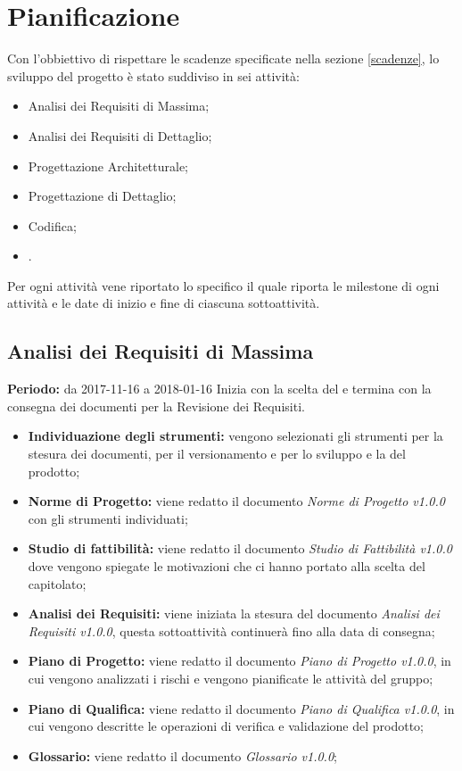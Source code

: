 \section{Pianificazione}
 
Con l'obbiettivo di rispettare le scadenze specificate nella sezione \ref{scadenze}, lo sviluppo del progetto è stato suddiviso in sei attività:
 
\begin{itemize}
 
	\item Analisi dei Requisiti di Massima;
 
	\item Analisi dei Requisiti di Dettaglio;
 
	\item Progettazione Architetturale;
 
	\item Progettazione di Dettaglio;
 
	\item Codifica;
 
	\item {}.
 
\end{itemize}
 
Per ogni attività vene riportato lo specifico  il quale riporta le milestone di ogni attività e le date di inizio e fine di ciascuna sottoattività.
 

\subsection{Analisi dei Requisiti di Massima}
\textbf{Periodo:} da 2017-11-16 a 2018-01-16\Spazio
Inizia con la scelta del  e termina con la consegna dei documenti per la Revisione dei Requisiti.
\begin{itemize}
	\item \textbf{Individuazione degli strumenti:} vengono selezionati gli strumenti per la stesura dei documenti, per il versionamento e per lo sviluppo e la  del prodotto;
	\item \textbf{Norme di Progetto:} viene redatto il documento \emph{Norme di Progetto v1.0.0} con gli strumenti individuati;  
	\item \textbf{Studio di fattibilità:} viene redatto il documento \emph{Studio di Fattibilità v1.0.0} dove vengono spiegate le motivazioni che ci hanno portato alla scelta del capitolato;
	\item \textbf{Analisi dei Requisiti:} viene iniziata la stesura del documento \emph{Analisi dei Requisiti v1.0.0}, questa sottoattività continuerà fino alla data di consegna;
	\item \textbf{Piano di Progetto:} viene redatto il documento \emph{Piano di Progetto v1.0.0}, in cui vengono analizzati i rischi e vengono pianificate le attività del gruppo; 
	\item \textbf{Piano di Qualifica:} viene redatto il documento \emph{Piano di Qualifica v1.0.0}, in cui vengono descritte le operazioni di verifica e validazione del prodotto;
	\item \textbf{Glossario:} viene redatto il documento \emph{Glossario v1.0.0};
\end{itemize}
